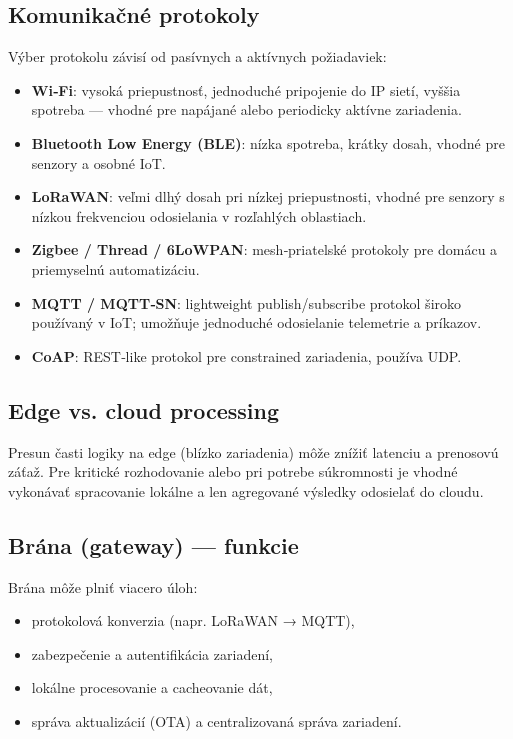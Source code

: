 \subsection{Komunikačné protokoly}
Výber protokolu závisí od pasívnych a aktívnych požiadaviek:
\begin{itemize}
\item 
\textbf{Wi‑Fi}: vysoká priepustnosť, jednoduché pripojenie do IP sietí, vyššia spotreba — vhodné pre napájané alebo periodicky aktívne zariadenia.
\item \textbf{Bluetooth Low Energy (BLE)}: nízka spotreba, krátky dosah, vhodné pre senzory a osobné IoT.
\item \textbf{LoRaWAN}: veľmi dlhý dosah pri nízkej priepustnosti, vhodné pre senzory s nízkou frekvenciou odosielania v rozľahlých oblastiach.
\item \textbf{Zigbee / Thread / 6LoWPAN}: mesh‑priatelské protokoly pre domácu a priemyselnú automatizáciu.
\item \textbf{MQTT / MQTT‑SN}: lightweight publish/subscribe protokol široko používaný v IoT; umožňuje jednoduché odosielanie telemetrie a príkazov.
\item \textbf{CoAP}: REST‑like protokol pre constrained zariadenia, používa UDP.
\end{itemize}

\subsection{Edge vs. cloud processing}
Presun časti logiky na edge (blízko zariadenia) môže znížiť latenciu a prenosovú záťaž. Pre kritické rozhodovanie alebo pri potrebe súkromnosti je vhodné vykonávať spracovanie lokálne a len agregované výsledky odosielať do cloudu.

\subsection{Brána (gateway) — funkcie}
Brána môže plniť viacero úloh:
\begin{itemize}
\item protokolová konverzia (napr. LoRaWAN → MQTT),
\item zabezpečenie a autentifikácia zariadení,
\item lokálne procesovanie a cacheovanie dát,
\item správa aktualizácií (OTA) a centralizovaná správa zariadení.
\end{itemize}

